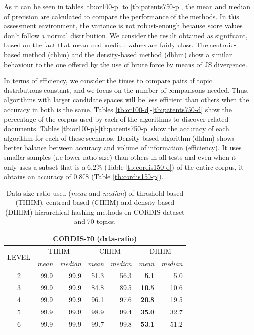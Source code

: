 As it can be seen in tables \ref{tb:or100-p} to \ref{tb:patents750-p}, the mean and median of precision are calculated to compare the performance of the methods. In this assessment environment, the variance is not robust-enough because score values don't follow a normal distribution. We consider the result obtained as significant, based on the fact that mean and median values are fairly close. The centroid-based method (chhm) and the density-based method (dhhm) show a similar behaviour to the one offered by the use of brute force by means of JS divergence. 

In terms of efficiency, we consider the times to compare pairs of topic distributions constant, and we focus on the number of comparisons needed. Thus, algorithms with larger candidate spaces will be less efficient than others when the accuracy in both is the same. Tables \ref{tb:or100-d}-\ref{tb:patents750-d} show the percentage of the corpus used by each of the algorithms to discover related documents. Tables \ref{tb:or100-p}-\ref{tb:patents750-p} show the accuracy of each algorithm for each of these scenarios. Density-based algorithm (dhhm) shows better balance between accuracy and volume of information (efficiency). It uses smaller samples (i.e lower ratio size) than others in all tests and even when it only uses a subset that is a $6.2\%$ (Table \ref{tb:cordis150-d}) of the entire corpus, it obtains an accuracy of $0.808$ (Table \ref{tb:cordis150-p}).


\begin{table}\centering
  \scriptsize
  \begin{tabular}{c|rr||rr||rr}
    \multicolumn{7}{c}{CORDIS-70 (data-ratio)} \\
    \toprule
    \multirow{2}{*}{LEVEL} &
      \multicolumn{2}{c}{THHM} &
      \multicolumn{2}{c}{CHHM} &
      \multicolumn{2}{c}{DHHM} \\
      & {\textit{mean}} & {\textit{median}} & {\textit{mean}} & {\textit{median}} & {\textit{mean}} & {\textit{median}} \\
      \midrule
    2 & 99.9 & 99.9 & 51.3 & 56.3 & \textbf{5.1} & 5.0 \\
    3 & 99.9 & 99.9 & 84.8 & 89.5 & \textbf{10.5} & 10.6 \\
    4 & 99.9 & 99.9 & 96.1 & 97.6 & \textbf{20.8} & 19.5 \\
    5 & 99.9 & 99.9 & 98.9 & 99.4 & \textbf{35.0} & 32.7 \\
    6 & 99.9 & 99.9 & 99.7 & 99.8 & \textbf{53.1} & 51.2 \\
    \bottomrule
  \end{tabular}
\caption{Data size ratio used (\textit{mean} and \textit{median}) of threshold-based (THHM), centroid-based (CHHM) and density-based (DHHM) hierarchical hashing methods on CORDIS dataset and 70 topics.}
\label{tb:cordis70-d}
\end{table}

